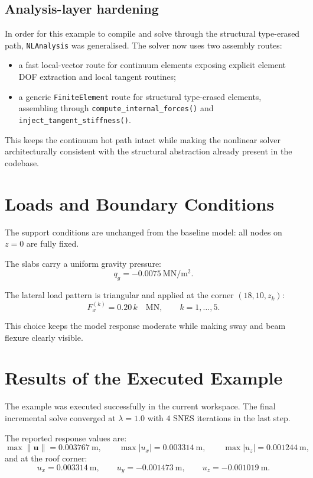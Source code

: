 \subsection{Analysis-layer hardening}

In order for this example to compile and solve through the structural
type-erased path, \texttt{NLAnalysis} was generalised.  The solver now uses two
assembly routes:
\begin{itemize}
  \item a fast local-vector route for continuum elements exposing explicit
        element DOF extraction and local tangent routines;
  \item a generic \texttt{FiniteElement} route for structural type-erased
        elements, assembling through \texttt{compute\_internal\_forces()} and
        \texttt{inject\_tangent\_stiffness()}.
\end{itemize}

This keeps the continuum hot path intact while making the nonlinear solver
architecturally consistent with the structural abstraction already present in
the codebase.

\section{Loads and Boundary Conditions}

The support conditions are unchanged from the baseline model:
all nodes on \(z=0\) are fully fixed.

The slabs carry a uniform gravity pressure:
\[
q_g = -0.0075\ \mathrm{MN/m^2}.
\]

The lateral load pattern is triangular and applied at the corner
\((18,10,z_k)\):
\[
F_x^{(k)} = 0.20\,k \quad \mathrm{MN},
\qquad
k = 1,\dots,5.
\]

This choice keeps the model response moderate while making sway and beam
flexure clearly visible.

\section{Results of the Executed Example}

The example was executed successfully in the current workspace.  The final
incremental solve converged at \(\lambda=1.0\) with \(4\) SNES iterations in
the last step.

The reported response values are:
\[
\max \|\mathbf{u}\| = 0.003767\ \mathrm{m},
\qquad
\max |u_x| = 0.003314\ \mathrm{m},
\qquad
\max |u_z| = 0.001244\ \mathrm{m},
\]
and at the roof corner:
\[
u_x = 0.003314\ \mathrm{m},
\qquad
u_y = -0.001473\ \mathrm{m},
\qquad
u_z = -0.001019\ \mathrm{m}.
\]

